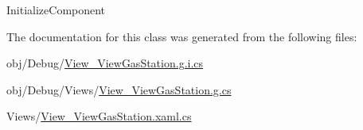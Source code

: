 Initialize\+Component 



The documentation for this class was generated from the following files\+:\begin{DoxyCompactItemize}
\item 
obj/\+Debug/\mbox{\hyperlink{_view___view_gas_station_8g_8i_8cs}{View\+\_\+\+View\+Gas\+Station.\+g.\+i.\+cs}}\item 
obj/\+Debug/\+Views/\mbox{\hyperlink{_view___view_gas_station_8g_8cs}{View\+\_\+\+View\+Gas\+Station.\+g.\+cs}}\item 
Views/\mbox{\hyperlink{_view___view_gas_station_8xaml_8cs}{View\+\_\+\+View\+Gas\+Station.\+xaml.\+cs}}\end{DoxyCompactItemize}
